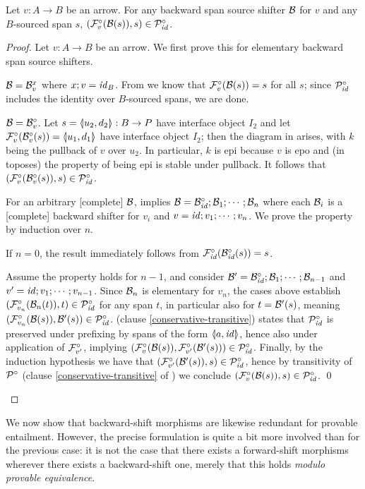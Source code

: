 \begin{lemma}
Let $v:A\to B$ be an arrow. For any backward span source shifter $\cB$ for $v$ and any $B$-sourced span $s$, $(\dF v(\cB(s)),s)\in \ccP_\id$.
\end{lemma}
%
\begin{proof}
Let $v:A\to B$ be an arrow. We first prove this for elementary backward span source shifters.
\begin{itemizeS}
\item $\cB=\rB v x$ where $x;v=\id_B$. From  we know that $\dF v(\cB(s))=s$ for all $s$; since $\ccP_\id$ includes the identity over $B$-sourced spans, we are done.

\item $\cB=\dB v$. Let $s=\spanof{u_2}{d_2}:B\to P$ have interface object $I_2$ and let $\dF v(\dB v(s))=\spanof{u_1}{d_1}$ have interface object $I_2$; then the diagram in  arises, with $k$ being the pullback of $v$ over $u_2$. In particular, $k$ is epi because $v$ is epo and (in toposes) the property of being epi is stable under pullback. It follows that $(\dF v(\dB v(s)),s)\in \ccP_\id$.
\end{itemizeS}
%
For an arbitrary [complete] $\cB$,  implies $\cB=\dB\id;\cB_1;\cdots;\cB_n$ where each $\cB_i$ is a [complete] backward shifter for $v_i$ and $v=\id;v_1;\cdots;v_n$. We prove the property by induction over $n$.
\begin{itemizeS}
\item If $n=0$, the result immediately follows from $\dF\id(\dB\id(s))=s$.
\item Assume the property holds for $n-1$, and consider $\cB'=\dB\id; \cB_1;\cdots;\cB_{n-1}$ and $v'=\id;v_1;\cdots;v_{n-1}$. Since $\cB_n$ is elementary for $v_n$, the cases above establish $(\dF{v_n}(\cB_n(t)),t)\in \ccP_\id$ for any span $t$, in particular also for $t=\cB'(s)$, meaning $(\dF{v_n}(\cB(s)),\cB'(s))\in \ccP_\id$.  (clause \ref{conservative-transitive}) states that $\ccP_\id$ is preserved under prefixing by spans of the form $\spanof a \id$, hence also under application of $\dF{v'}$, implying $(\dF{v}(\cB(s)),\dF{v'}(\cB'(s)))\in \ccP_\id$. Finally, by the induction hypothesis we have that $(\dF{v'}(\cB'(s)),s)\in \ccP_\id$, hence by transitivity of $\ccP$ (clause \ref{conservative-transitive} of ) we conclude $(\dF{v}(\cB(s)),s)\in \ccP_\id$.
\qed
\end{itemizeS}
\end{proof}
%
We now show that backward-shift morphisms are likewise redundant for provable entailment. However, the precise formulation is quite a bit more involved than for the previous case: it is not the case that there exists a forward-shift morphisms wherever there exists a backward-shift one, merely that this holds \emph{modulo provable equivalence}.

